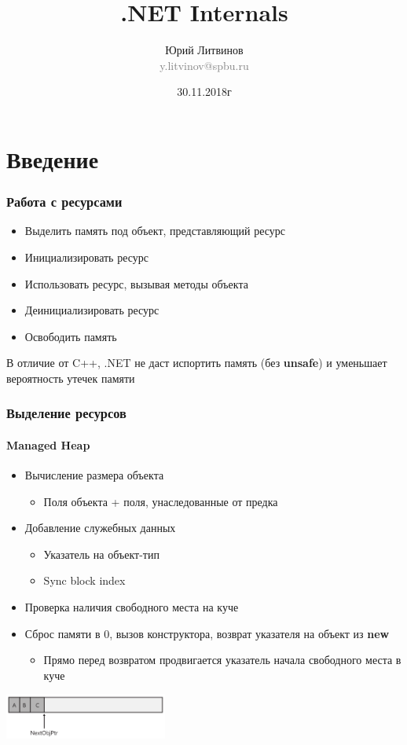\documentclass[xetex,mathserif,serif]{beamer}
\title{.NET Internals}
\author[Юрий Литвинов]{Юрий Литвинов\\\small{\textcolor{gray}{y.litvinov@spbu.ru}}}
\date{30.11.2018г}
\begin{document}
	\frame{\titlepage}

	\section{Введение}

	\begin{frame}
		\frametitle{Работа с ресурсами}
		\begin{itemize}
			\item Выделить память под объект, представляющий ресурс
			\item Инициализировать ресурс
			\item Использовать ресурс, вызывая методы объекта
			\item Деинициализировать ресурс
			\item Освободить память
		\end{itemize}
		В отличие от C++, .NET не даст испортить память (без \textbf{unsafe}) и уменьшает вероятность утечек памяти
	\end{frame}

	\begin{frame}
		\frametitle{Выделение ресурсов}
		\framesubtitle{Managed Heap}
		\begin{itemize}
			\item Вычисление размера объекта
			\begin{itemize}
				\item Поля объекта + поля, унаследованные от предка
			\end{itemize}
			\item Добавление служебных данных
			\begin{itemize}
				\item Указатель на объект-тип
				\item Sync block index
			\end{itemize}
			\item Проверка наличия свободного места на куче
			\item Сброс памяти в 0, вызов конструктора, возврат указателя на объект из \textbf{new}
			\begin{itemize}
				\item Прямо перед возвратом продвигается указатель начала свободного места в куче
			\end{itemize}
		\end{itemize}
		\begin{center}
			\includegraphics[width=0.4\textwidth]{heapAllocation.png}
		\end{center}
	\end{frame}
\end{document}
